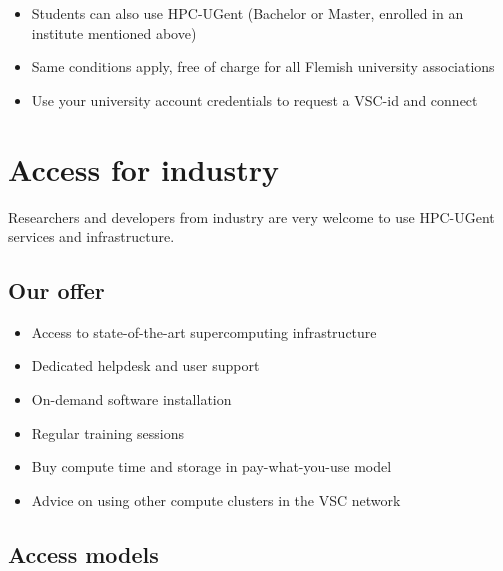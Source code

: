 \begin{itemize}
  \item Students can also use HPC-UGent (Bachelor or Master, enrolled in an institute mentioned above)
  \item Same conditions apply, free of charge for all Flemish university associations
  \item Use your university account credentials to request a VSC-id and connect
\end{itemize}



\section{Access for industry}

Researchers and developers from industry are very welcome to use HPC-UGent services and infrastructure.


\subsection{Our offer}

\begin{itemize}
  \item Access to state-of-the-art supercomputing infrastructure
  \item Dedicated helpdesk and user support
  \item On-demand software installation
  \item Regular training sessions
  \item Buy compute time and storage in pay-what-you-use model
  \item Advice on using other compute clusters in the VSC network
\end{itemize}


\subsection{Access models}

